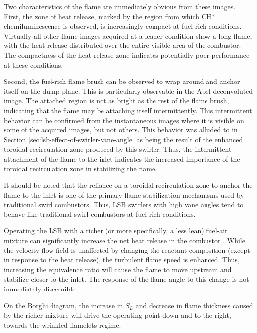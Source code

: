 Two characteristics of the flame are immediately obvious from these images.
First, the zone of heat release, marked by the region from which CH* chemiluminescence is observed, is increasingly compact at fuel-rich conditions.
Virtually all other flame images acquired at a leaner condition show a long flame, with the heat release distributed over the entire visible area of the combustor.
The compactness of the heat release zone indicates potentially poor  performance at these conditions.

Second, the fuel-rich flame brush can be observed to wrap around and anchor itself on the dump plane.
This is particularly observable in the Abel-deconvoluted image.
The attached region is not as bright as the rest of the flame brush, indicating that the flame may be attaching itself intermittently.
This intermittent behavior can be confirmed from the instantaneous images where it is visible on some of the acquired images, but not others.
This behavior was alluded to in Section \ref{sec:lsb-effect-of-swirler-vane-angle} as being the result of the enhanced toroidal recirculation zone produced by this swirler.
Thus, the intermittent attachment of the flame to the inlet indicates the increased importance of the toroidal recirculation zone in stabilizing the flame.

It should be noted that the reliance on a toroidal recirculation zone to anchor the flame to the inlet is one of the primary flame stabilization mechanisms used by traditional swirl combustors.
Thus, LSB swirlers with high vane angles tend to behave like traditional swirl combustors at fuel-rich conditions.

Operating the LSB with a richer (or more specifically, a less lean) fuel-air mixture can significantly increase the net heat release in the combustor .
While the velocity flow field is unaffected by changing the reactant composition (except in response to the heat release), the turbulent flame speed is enhanced.
Thus, increasing the equivalence ratio will cause the flame to move upstream and stabilize closer to the inlet.
The response of the flame angle to this change is not immediately discernible.

On the Borghi diagram, the increase in \(S_L\) and decrease in flame thickness caused by the richer mixture will drive the operating point down and to the right, towards the wrinkled flamelets regime.

